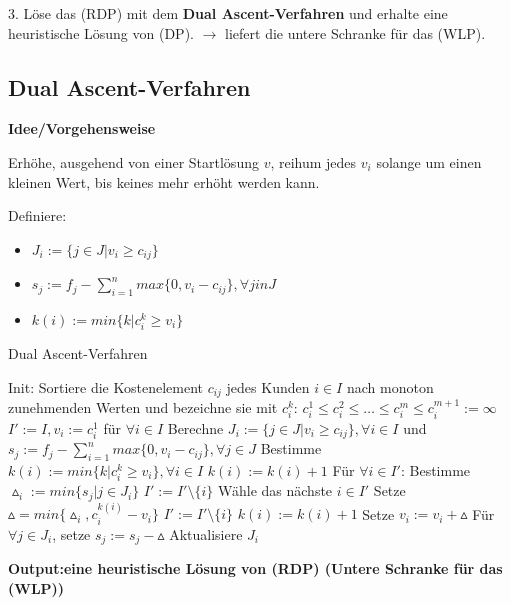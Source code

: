       \par 3. Löse das (RDP) mit dem \textbf{Dual Ascent-Verfahren} und erhalte eine heuristische Lösung von (DP). $\rightarrow$ liefert die untere Schranke für das (WLP).

      \subsection{Dual Ascent-Verfahren} %
      \label{sub:dual_ascent_verfahren}

        \par \textbf{Idee/Vorgehensweise}
        \par Erhöhe, ausgehend von einer Startlösung $v$, reihum jedes $v_i$ solange um einen kleinen Wert, bis keines mehr erhöht werden kann.

        \par Definiere:
        \begin{itemize}
          \item $J_i := \{j \in J | v_i \geq c_{ij}\}$
          \item $s_j := f_j - \sum_{i = 1}^{n}max\{0, v_i - c_{ij}\}, \forall j in J$
          \item $k(i) := min\{k|c_i^k \geq v_i\}$
        \end{itemize}

        \begin{algorithm}[H]
          \begin{algorithmic}[1]
            \caption{Dual Ascent-Verfahren}
            \State Init:
            \State Sortiere die Kostenelement $c_{ij}$ jedes Kunden $i \in I$ nach monoton zunehmenden Werten und bezeichne sie mit $c_i^k$: $c_i^1 \leq c_i^2 \leq \dots \leq c_i^m \leq c_i^{m+1}:= \infty$
            \State $I':= I, v_i := c_i^1$ für $\forall i \in I$
            \State Berechne $J_i := \{j \in J | v_i \geq c_{ij}\}, \forall i \in I$ und  $s_j := f_j - \sum_{i = 1}^{n}max\{0, v_i - c_{ij}\}, \forall j \in J$
            \State Bestimme $k(i) := min\{k|c_i^k \geq v_i\}, \forall i \in I$
              \State $k(i) := k(i) + 1$
            \EndIf
              \State Für $\forall i \in I'$: Bestimme $\vartriangle_i := min\{s_j|j \in J_i\}$
                \State $I':=I' \setminus \{i\}$
                \State Wähle das nächste $i \in I'$
              \EndIf
              \State Setze $\vartriangle = min\{\vartriangle_i, c_i^{k(i)} - v_i\}$
                \State $I' := I' \setminus \{i\}$
              \Else 
                \State $k(i) := k(i) + 1$
              \EndIf
              \State Setze $v_i := v_i + \vartriangle$ 
              \State Für $\forall j \in J_i$, setze $s_j := s_j - \vartriangle$
              \State Aktualisiere $J_i$
            \EndWhile
            \end{algorithmic}
          \textbf{Output:eine heuristische Lösung von (RDP) (Untere Schranke für das (WLP))} 
        \end{algorithm}

